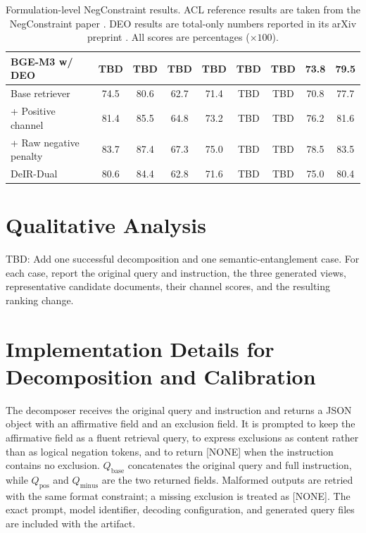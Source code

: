 \documentclass[letterpaper]{article}
\newcommand{\method}{DeIR-Dual}
\newcommand{\qbase}{Q_{\text{base}}}
\newcommand{\qpos}{Q_{\text{pos}}}
\newcommand{\qminus}{Q_{\text{minus}}}
\begin{document}
\begin{table}[!t]
\begin{tabular}{lcc|cc|cc|cc}
BGE-M3 w/ DEO & \textnormal{TBD} & \textnormal{TBD} & \textnormal{TBD} & \textnormal{TBD} & \textnormal{TBD} & \textnormal{TBD} & 73.8 & 79.5 \\
\midrule
Base retriever & 74.5 & 80.6 & 62.7 & 71.4 & \textnormal{TBD} & \textnormal{TBD} & 70.8 & 77.7 \\
+ Positive channel & 81.4 & 85.5 & 64.8 & 73.2 & \textnormal{TBD} & \textnormal{TBD} & 76.2 & 81.6 \\
+ Raw negative penalty & 83.7 & 87.4 & 67.3 & 75.0 & \textnormal{TBD} & \textnormal{TBD} & 78.5 & 83.5 \\
\method{} & 80.6 & 84.4 & 62.8 & 71.6 & \textnormal{TBD} & \textnormal{TBD} & 75.0 & 80.4 \\
\bottomrule
\end{tabular}
\caption{Formulation-level NegConstraint results.  ACL reference results
  are taken from the NegConstraint paper \cite{xu2025logical}.  DEO
  results are total-only numbers reported in its arXiv preprint
  \cite{deo2026}.  All scores are percentages ($\times 100$).}
\label{tab:negconstraint-full}
\end{table}

\section{Qualitative Analysis}
\label{app:qualitative}

\textnormal{TBD:} Add one successful decomposition and one
semantic-entanglement case.  For each case, report the original query and
instruction, the three generated views, representative candidate
documents, their channel scores, and the resulting ranking change.

\section{Implementation Details for Decomposition and Calibration}
\label{app:implementation}

The decomposer receives the original query and instruction and returns a
JSON object with an affirmative field and an exclusion field.  It is
prompted to keep the affirmative field as a fluent retrieval query, to
express exclusions as content rather than as logical negation tokens,
and to return \textnormal{[NONE]} when the instruction contains no
exclusion.  $\qbase$ concatenates the original query and full
instruction, while $\qpos$ and $\qminus$ are the two returned fields.
Malformed outputs are retried with the same format constraint; a missing
exclusion is treated as \textnormal{[NONE]}.  The exact prompt, model
identifier, decoding configuration, and generated query files are
included with the artifact.
\end{document}
